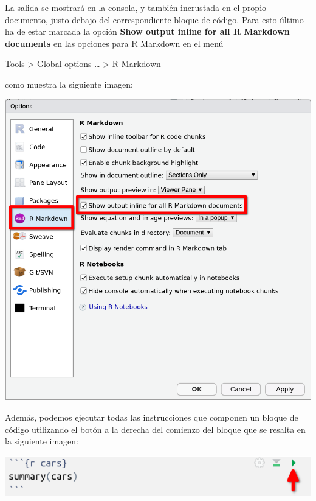 \documentclass[
  degree=mecinf,
  title=normal,
  toc=normal,
  bib=normal]{mnye}
\newenvironment{menu}{
    \begin{center}
    \sffamily\bfseries
}{
    \end{center}
}
\begin{document}
La salida se mostrará en la consola, y también incrustada en el propio documento, justo debajo del correspondiente bloque de código. Para esto último ha de estar marcada la opción \textbf{Show output inline for all R Markdown documents} en las opciones para R Markdown en el menú

\begin{menu}
Tools \textgreater{} Global options \ldots{} \textgreater{} R Markdown

\end{menu}

como muestra la siguiente imagen:

\begin{center}\includegraphics[width=1\linewidth]{images/options-r-markdown-b} \end{center}

Además, podemos ejecutar todas las instrucciones que componen un bloque de código utilizando el botón a la derecha del comienzo del bloque que se resalta en la siguiente imagen:

\begin{center}\includegraphics[width=0.8\linewidth]{images/run} \end{center}
\end{document}
